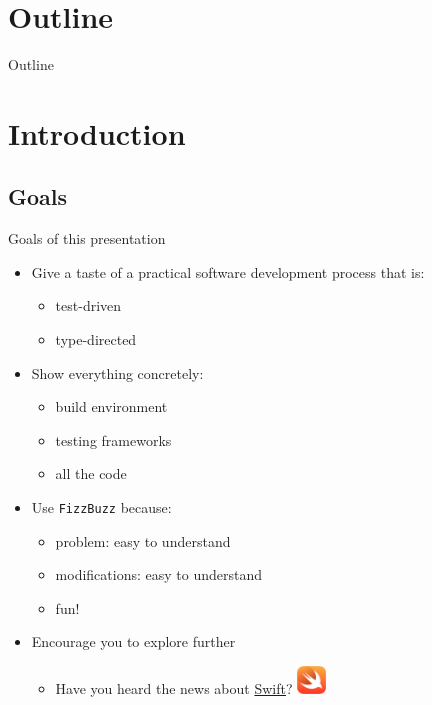 \section*{Outline}

\begin{frame}{Outline}
  \tableofcontents[subsectionstyle=hide]
\end{frame}



\section{Introduction}

\subsection{Goals}

\begin{frame}{Goals of this presentation}
  \begin{itemize}
  \item Give a taste of a \alert{practical} software development \alert{process} that is:
    \begin{itemize}
    \item \alert{test}-driven
    \item \alert{type}-directed
    \end{itemize}
  \item Show everything concretely:
    \begin{itemize}
    \item build environment
    \item testing frameworks
    \item all the code
    \end{itemize}
  \item Use \texttt{FizzBuzz} because:
    \begin{itemize}
    \item problem: easy to understand
    \item modifications: easy to understand
    \item fun!
    \end{itemize}
  \item Encourage you to explore further
    \begin{itemize}
    \item Have you heard the news about \href{https://developer.apple.com/swift/}{Swift}?
      \includegraphics[height=0.75cm]{swift-hero.png}
    \end{itemize}
  \end{itemize}
\end{frame}

